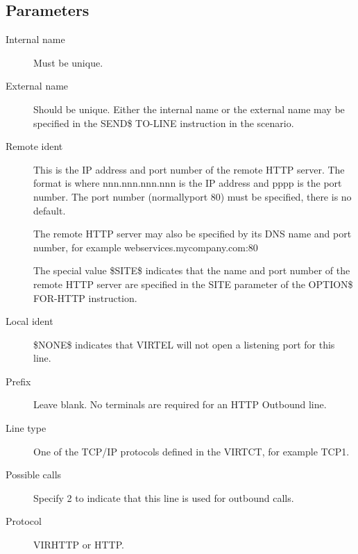 \documentclass[letterpaper,10pt,english]{sphinxmanual}
\begin{document}
\subsection{Parameters}
\label{\detokenize{connectivity_guide:index-16}}\label{\detokenize{connectivity_guide:id2}}\begin{description}
\item[{Internal name}] \leavevmode
Must be unique.

\item[{External name}] \leavevmode
Should be unique. Either the internal name or the external name may be specified in the SEND\$ TO-LINE instruction in the scenario.

\item[{Remote ident}] \leavevmode
This is the IP address and port number of the remote HTTP server. The format is  where nnn.nnn.nnn.nnn is the
IP address and pppp is the port number. The port number (normallyport 80) must be specified, there is no default.

The remote HTTP server may also be specified by its DNS name and port number, for example webservices.mycompany.com:80

The special value \$SITE\$ indicates that the name and port number of the remote HTTP server are specified in the SITE parameter of the OPTION\$ FOR-HTTP instruction.

\item[{Local ident}] \leavevmode
\$NONE\$ indicates that VIRTEL will not open a listening port for this line.

\item[{Prefix}] \leavevmode
Leave blank. No terminals are required for an HTTP Outbound line.

\item[{Line type}] \leavevmode
One of the TCP/IP protocols defined in the VIRTCT, for example TCP1.

\item[{Possible calls}] \leavevmode
Specify 2 to indicate that this line is used for outbound calls.

\item[{Protocol}] \leavevmode
VIRHTTP or HTTP.

\end{description}

\end{document}
